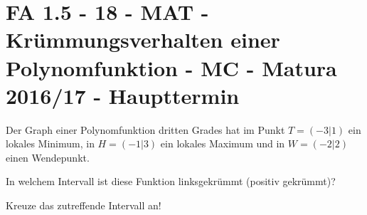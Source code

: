 \section{FA 1.5 - 18 - MAT - Krümmungsverhalten einer Polynomfunktion - MC - Matura 2016/17 - Haupttermin}

\begin{beispiel}[FA 1.5]{1} %
Der Graph einer Polynomfunktion dritten Grades hat im Punkt $T = (-3|1)$ ein lokales Minimum, in $H=(-1|3)$ ein lokales Maximum und in $W = (-2|2)$ einen Wendepunkt. \leer

In welchem Intervall ist diese Funktion linksgekrümmt (positiv gekrümmt)? 

Kreuze das zutreffende Intervall an! \leer

\end{beispiel}